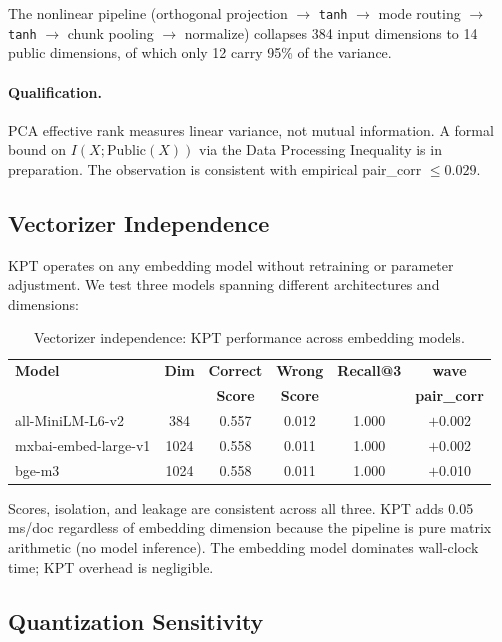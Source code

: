\documentclass{article}
\begin{document}
The nonlinear pipeline (orthogonal projection $\to$ \texttt{tanh} $\to$ mode routing $\to$ \texttt{tanh} $\to$ chunk pooling $\to$ normalize) collapses 384 input dimensions to 14 public dimensions, of which only 12 carry 95\% of the variance.

\paragraph{Qualification.}
PCA effective rank measures linear variance, not mutual information.
A formal bound on $I(X; \mathrm{Public}(X))$ via the Data Processing Inequality is in preparation.
The observation is consistent with empirical pair\_corr $\leq 0.029$.

\subsection{Vectorizer Independence}

KPT operates on any embedding model without retraining or parameter adjustment.
We test three models spanning different architectures and dimensions:

\begin{table}[htbp]
\centering
\caption{Vectorizer independence: KPT performance across embedding models.}
\label{tab:vectorizer}
\begin{tabular}{@{}lccccc@{}}
\toprule
\textbf{Model} & \textbf{Dim} & \textbf{Correct} & \textbf{Wrong} & \textbf{Recall@3} & \textbf{wave} \\
 & & \textbf{Score} & \textbf{Score} & & \textbf{pair\_corr} \\
\midrule
all-MiniLM-L6-v2 & 384 & 0.557 & 0.012 & 1.000 & $+$0.002 \\
mxbai-embed-large-v1 & 1024 & 0.558 & 0.011 & 1.000 & $+$0.002 \\
bge-m3 & 1024 & 0.558 & 0.011 & 1.000 & $+$0.010 \\
\bottomrule
\end{tabular}
\end{table}

Scores, isolation, and leakage are consistent across all three.
KPT adds 0.05\,ms/doc regardless of embedding dimension because the pipeline is pure matrix arithmetic (no model inference).
The embedding model dominates wall-clock time; KPT overhead is negligible.

\subsection{Quantization Sensitivity}
\end{document}
